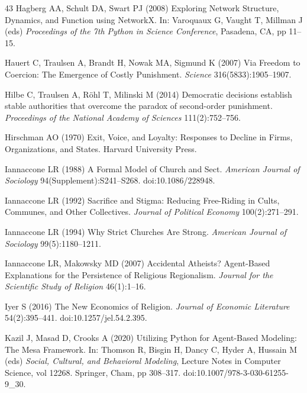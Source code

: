 \documentclass[12pt]{article}
\begin{document}
\begin{thebibliography}{43}
Hagberg AA, Schult DA, Swart PJ (2008) Exploring Network Structure, Dynamics, and Function using NetworkX. In: Varoquaux G, Vaught T, Millman J (eds) \textit{Proceedings of the 7th Python in Science Conference}, Pasadena, CA, pp 11--15.

Hauert C, Traulsen A, Brandt H, Nowak MA, Sigmund K (2007) Via Freedom to Coercion: The Emergence of Costly Punishment. \textit{Science} 316(5833):1905--1907.

Hilbe C, Traulsen A, R\"ohl T, Milinski M (2014) Democratic decisions establish stable authorities that overcome the paradox of second-order punishment. \textit{Proceedings of the National Academy of Sciences} 111(2):752--756.

Hirschman AO (1970) Exit, Voice, and Loyalty: Responses to Decline in Firms, Organizations, and States. Harvard University Press.

Iannaccone LR (1988) A Formal Model of Church and Sect. \textit{American Journal of Sociology} 94(Supplement):S241--S268. doi:10.1086/228948.

Iannaccone LR (1992) Sacrifice and Stigma: Reducing Free-Riding in Cults, Communes, and Other Collectives. \textit{Journal of Political Economy} 100(2):271--291.

Iannaccone LR (1994) Why Strict Churches Are Strong. \textit{American Journal of Sociology} 99(5):1180--1211.

Iannaccone LR, Makowsky MD (2007) Accidental Atheists? Agent-Based Explanations for the Persistence of Religious Regionalism. \textit{Journal for the Scientific Study of Religion} 46(1):1--16.

Iyer S (2016) The New Economics of Religion. \textit{Journal of Economic Literature} 54(2):395--441. doi:10.1257/jel.54.2.395.

Kazil J, Masad D, Crooks A (2020) Utilizing Python for Agent-Based Modeling: The Mesa Framework. In: Thomson R, Bisgin H, Dancy C, Hyder A, Hussain M (eds) \textit{Social, Cultural, and Behavioral Modeling}, Lecture Notes in Computer Science, vol 12268. Springer, Cham, pp 308--317. doi:10.1007/978-3-030-61255-9\_30.


\end{thebibliography}
\end{document}
